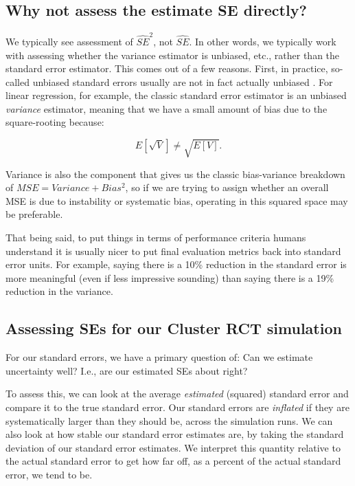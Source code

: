 \documentclass[
]{book}
\begin{document}
\hypertarget{why-not-assess-the-estimate-se-directly}{%
\subsection{Why not assess the estimate SE directly?}\label{why-not-assess-the-estimate-se-directly}}

We typically see assessment of \(\widehat{SE}^2\), not \(\widehat{SE}\).
In other words, we typically work with assessing whether the variance estimator is unbiased, etc., rather than the standard error estimator.
This comes out of a few reasons.
First, in practice, so-called unbiased standard errors usually are not in fact actually unbiased \citet{GerberGreen}.
For linear regression, for example, the classic standard error estimator is an unbiased \emph{variance} estimator, meaning that we have a small amount of bias due to the square-rooting because:

\[ E[ \sqrt{ V } ] \neq \sqrt{ E[ V ] } . \]

Variance is also the component that gives us the classic bias-variance breakdown of \(MSE = Variance + Bias^2\), so if we are trying to assign whether an overall MSE is due to instability or systematic bias, operating in this squared space may be preferable.

That being said, to put things in terms of performance criteria humans understand it is usually nicer to put final evaluation metrics back into standard error units.
For example, saying there is a 10\% reduction in the standard error is more meaningful (even if less impressive sounding) than saying there is a 19\% reduction in the variance.

\hypertarget{assessing-ses-for-our-cluster-rct-simulation}{%
\subsection{Assessing SEs for our Cluster RCT simulation}\label{assessing-ses-for-our-cluster-rct-simulation}}

For our standard errors, we have a primary question of: Can we estimate uncertainty well? I.e., are our estimated SEs about right?

To assess this, we can look at the average \emph{estimated} (squared) standard error and compare it to the true standard error.
Our standard errors are \emph{inflated} if they are systematically larger than they should be, across the simulation runs.
We can also look at how stable our standard error estimates are, by taking the standard deviation of our standard error estimates.
We interpret this quantity relative to the actual standard error to get how far off, as a percent of the actual standard error, we tend to be.
\end{document}
